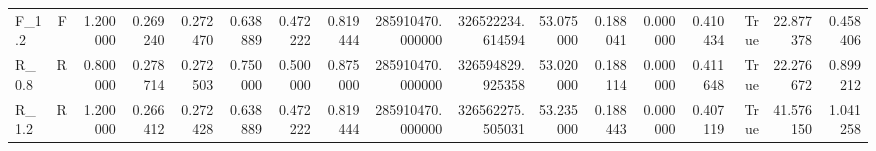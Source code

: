 \begin{tabular}{lrrrrrrrrrrrrrrrr}
F\_1.2 & F & 1.200000 & 0.269240 & 0.272470 & 0.638889 & 0.472222 & 0.819444 & 285910470.000000 & 326522234.614594 & 53.075000 & 0.188041 & 0.000000 & 0.410434 & True & 22.877378 & 0.458406 \\
R\_0.8 & R & 0.800000 & 0.278714 & 0.272503 & 0.750000 & 0.500000 & 0.875000 & 285910470.000000 & 326594829.925358 & 53.020000 & 0.188114 & 0.000000 & 0.411648 & True & 22.276672 & 0.899212 \\
R\_1.2 & R & 1.200000 & 0.266412 & 0.272428 & 0.638889 & 0.472222 & 0.819444 & 285910470.000000 & 326562275.505031 & 53.235000 & 0.188443 & 0.000000 & 0.407119 & True & 41.576150 & 1.041258 \\
\bottomrule
\end{tabular}
